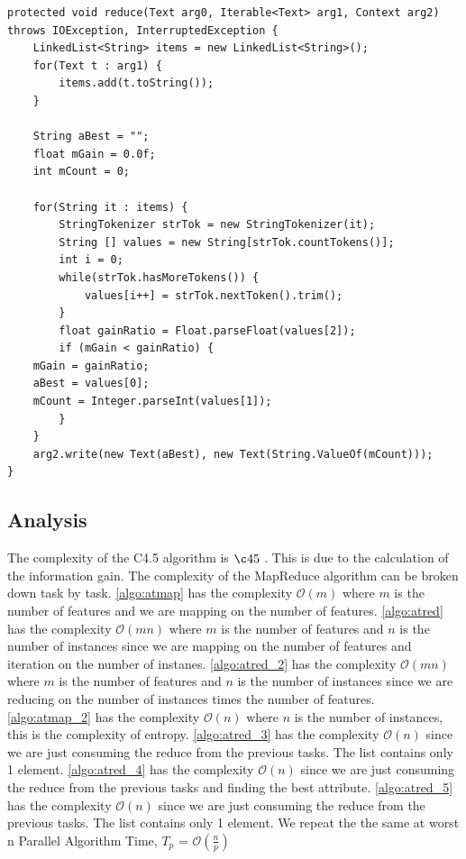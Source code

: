\documentclass{article}
\begin{document}
\begin{lstlisting}[caption={Attrib Selection Reducer 2 code snippet},label={lst:attrselred},style=MyJavaStyle]
protected void reduce(Text arg0, Iterable<Text> arg1, Context arg2)
throws IOException, InterruptedException {
    LinkedList<String> items = new LinkedList<String>();
    for(Text t : arg1) {
        items.add(t.toString());
    }

    String aBest = "";
    float mGain = 0.0f;
    int mCount = 0;

    for(String it : items) {
        StringTokenizer strTok = new StringTokenizer(it);
        String [] values = new String[strTok.countTokens()];
        int i = 0;
        while(strTok.hasMoreTokens()) {
            values[i++] = strTok.nextToken().trim();
        }
        float gainRatio = Float.parseFloat(values[2]);
        if (mGain < gainRatio) {
	mGain = gainRatio;
	aBest = values[0];
	mCount = Integer.parseInt(values[1]);
        }
    }
    arg2.write(new Text(aBest), new Text(String.ValueOf(mCount)));
}
\end{lstlisting}

\subsection{Analysis}
The complexity of the C4.5 algorithm is $\c45$ \cite{complexity}. This is due to the calculation of the information gain.
The complexity of the MapReduce algorithm can be broken down task by task.
\ref{algo:atmap} has the complexity $\mathcal{O}(m)$ where $m$ is the number of features and we are mapping on the number of features.
\ref{algo:atred} has the complexity $\mathcal{O}(mn)$ where $m$ is the number of features and $n$ is the number of instances since we are mapping on the number of features and iteration on the number of instanes.
\ref{algo:atred_2} has the complexity $\mathcal{O}(mn)$ where $m$ is the number of features and $n$ is the number of instances since we are reducing on the number of instances times the number of features.
\ref{algo:atmap_2} has the complexity $\mathcal{O}(n)$ where $n$ is the number of instances, this is the complexity of entropy. \cite{complexity}
\ref{algo:atred_3} has the complexity $\mathcal{O}(n)$ since we are just consuming the reduce from the previous tasks. The list contains only 1 element.
\ref{algo:atred_4} has the complexity $\mathcal{O}(n)$ since we are just consuming the reduce from the previous tasks and finding the best attribute.
\ref{algo:atred_5} has the complexity $\mathcal{O}(n)$ since we are just consuming the reduce from the previous tasks. The list contains only 1 element.
We repeat the the same at worst n
Parallel Algorithm Time, ${T_{p}}$ = $\mathcal{O}(\frac{n}{p})$
\end{document}
